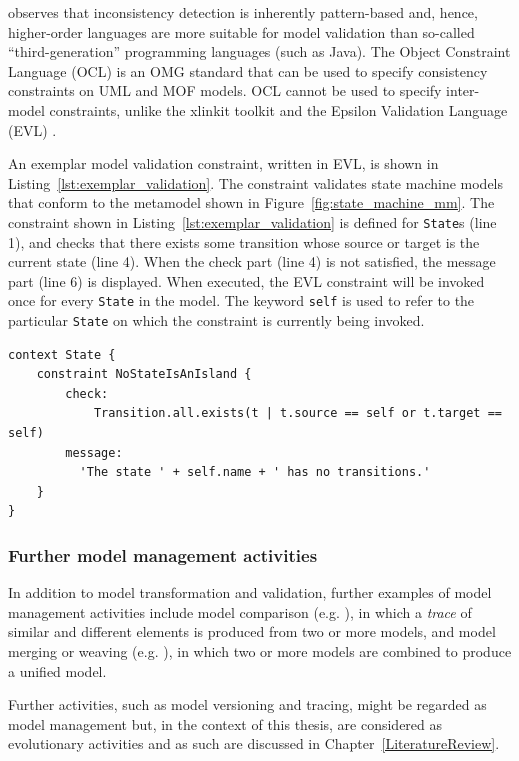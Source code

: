 \cite{kolovos09thesis} observes that inconsistency detection is inherently pattern-based and, hence, higher-order languages are more suitable for model validation than so-called ``third-generation'' programming languages (such as Java). The Object Constraint Language (OCL) \cite{ocl2} is an OMG standard that can be used to specify consistency constraints on UML and MOF models. OCL cannot be used to specify inter-model constraints, unlike the xlinkit toolkit \cite{nentwich2003flexible} and the Epsilon Validation Language (EVL) \cite{kolovos08evl}.

An exemplar model validation constraint, written in EVL, is shown in Listing~\ref{lst:exemplar_validation}. The constraint validates state machine models that conform to the metamodel shown in Figure~\ref{fig:state_machine_mm}. The constraint shown in Listing~\ref{lst:exemplar_validation} is defined for \texttt{State}s (line 1), and checks that there exists some transition whose source or target is the current state (line 4). When the check part (line 4) is not satisfied, the message part (line 6) is displayed. When executed, the EVL constraint will be invoked once for every \texttt{State} in the model. The keyword \texttt{self} is used to refer to the particular \texttt{State} on which the constraint is currently being invoked.

\begin{lstlisting}[caption={[Exemplar model validation in EVL]Exemplar model validation in the Epsilon Validation Language}, label=lst:exemplar_validation, language=EVL]
context State {
	constraint NoStateIsAnIsland {
		check:
			Transition.all.exists(t | t.source == self or t.target == self)
		message:
		  'The state ' + self.name + ' has no transitions.'
	}
}
\end{lstlisting}

\subsubsection{Further model management activities}
In addition to model transformation and validation, further examples of model management activities include model comparison (e.g. \cite{kolovos06ecl}), in which a \emph{trace} of similar and different elements is produced from two or more models, and model merging or weaving (e.g. \cite{kolovos07eml}), in which two or more models are combined to produce a unified model.

Further activities, such as model versioning and tracing, might be regarded as model management but, in the context of this thesis, are considered as evolutionary activities and as such are discussed in Chapter~\ref{LiteratureReview}.

